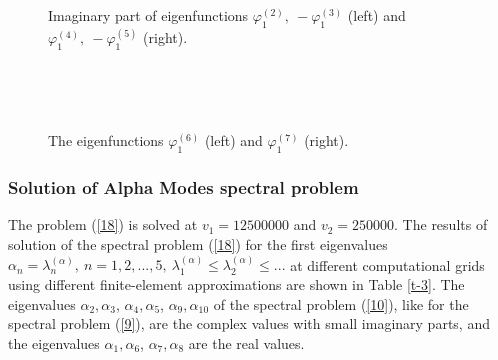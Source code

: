 \documentclass[authoryear]{elsarticle}
\begin{document}
\begin{figure}[htp]
  \begin{center}
\begin{minipage}{0.49\linewidth}
 \\
\end{minipage}
\hfill
\begin{minipage}{0.49\linewidth}
 \\
\end{minipage}
\caption{Imaginary part of eigenfunctions $\varphi^{(2)}_1, \ - \varphi^{(3)}_1$ (left) and $\varphi^{(4)}_1, \ - \varphi^{(5)}_1$ (right).}
\label{fig:5}
  \end{center}
\end{figure}

\begin{figure}[htp]
  \begin{center}
\begin{minipage}{0.49\linewidth}
 \\
\end{minipage}
\hfill
\begin{minipage}{0.49\linewidth}
 \\
\end{minipage}
\caption{The eigenfunctions $\varphi^{(6)}_1$ (left) and $\varphi^{(7)}_1$ (right).}
\label{fig:6}
  \end{center}
\end{figure}

\subsubsection{Solution of Alpha Modes spectral problem} 
The problem  (\ref{18}) is solved at $v_1 = 12 500 000$ and $v_2 = 250 000$. The results of solution of the spectral problem (\ref{18}) for the first eigenvalues $\alpha_n = \lambda_n^{(\alpha)}, \ n = 1,2, ..., 5, \  \lambda_1^{(\alpha)} \leq  \lambda_2^{(\alpha )} \leq ...$
at different computational grids using different finite-element approximations are shown in Table \ref{t-3}. 
The eigenvalues $\alpha_2, \alpha_3$, $\alpha_4, \alpha_5$, $\alpha_9, \alpha_{10}$ of the spectral problem (\ref{10}), like for the spectral problem (\ref{9}), are the complex values with small imaginary parts, and the eigenvalues $\alpha_1, \alpha_6$, $\alpha_7, \alpha_8$ are the real values.
\end{document}
